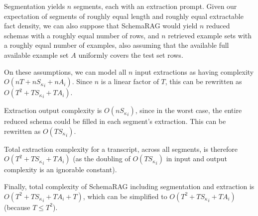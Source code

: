 Segmentation yields $n$ segments, each with an extraction prompt.
Given our expectation of segments of roughly equal length and roughly equal extractable fact density, we can also suppose that SchemaRAG would yield $n$ reduced schemas with a roughly equal number of rows, and $n$ retrieved example sets with a roughly equal number of examples, also assuming that the available full available example set $A$ uniformly covers the test set rows. 

On these assumptions, we can model all $n$ input extractions as having complexity 
$O(nT + n{S_\kappa}_i + nA_i)$.
Since $n$ is a linear factor of $T$, 
this can be rewritten as $O(T^2 + T{S_\kappa}_i + TA_i)$.

Extraction output complexity is $O(n{{S_\kappa}_i})$, since in the worst case, the entire reduced schema could be filled in each segment's extraction. This can be rewritten as $O(T{S_\kappa}_i)$.

Total extraction complexity for a transcript, across all segments, is therefore 
$O(T^2 + T{S_\kappa}_i + TA_i)$
(as the doubling of $O(T{{S_\kappa}_i})$ in input and output complexity is an ignorable constant).

Finally, total complexity of SchemaRAG including segmentation and extraction is 
$O(T^2 + T{S_\kappa}_i + TA_i + T)$,
which can be simplified to 
$O(T^2 + T{S_\kappa}_i + TA_i)$
(because $T \leq T^2$).



